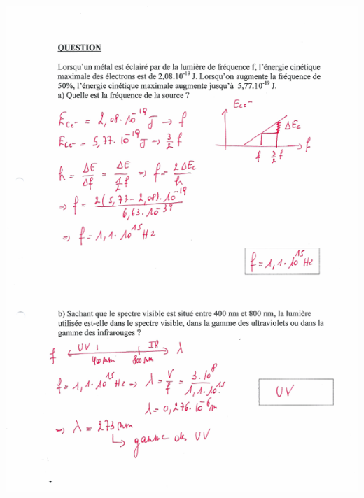 {{{\includegraphics[width=17.498cm,height=24.13cm]{Pictures/10000001000002570000033BF05D77DDF7E1650A.png}

}}}
